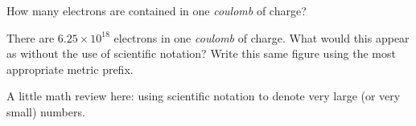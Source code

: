 

How many electrons are contained in one {\it coulomb} of charge?







There are $6.25 \times 10^{18}$ electrons in one {\it coulomb} of charge.  What would this appear as without the use of scientific notation?  Write this same figure using the most appropriate metric prefix.







A little math review here: using scientific notation to denote very large (or very small) numbers.




